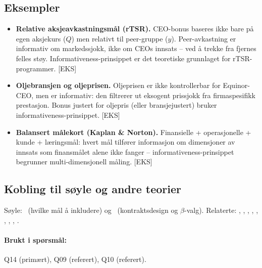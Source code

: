 \subsection*{Eksempler}
\begin{itemize}\setlength{\itemsep}{2pt}
\item \textbf{Relative aksjeavkastningsmål (rTSR).} CEO-bonus baseres ikke bare på egen aksjekurs ($Q$) men relativt til peer-gruppe ($y$). Peer-avkastning er informativ om markedssjokk, ikke om CEOs innsats -- ved å trekke fra fjernes felles støy. Informativeness-prinsippet er det teoretiske grunnlaget for rTSR-programmer. [EKS]
\item \textbf{Oljebransjen og oljeprisen.} Oljeprisen er ikke kontrollerbar for Equinor-CEO, men er informativ: den filtrerer ut eksogent prissjokk fra firmaspesifikk prestasjon. Bonus justert for oljepris (eller bransjejustert) bruker informativeness-prinsippet. [EKS]
\item \textbf{Balansert målekort (Kaplan \& Norton).} Finansielle + operasjonelle + kunde + læringsmål: hvert mål tilfører informasjon om dimensjoner av innsats som finansmålet alene ikke fanger -- informativeness-prinsippet begrunner multi-dimensjonell måling. [EKS]
\end{itemize}

\subsection*{Kobling til søyle og andre teorier}
Søyle: \STwo\ (hvilke mål å inkludere) og \SThree\ (kontraktsdesign og $\beta$-valg). Relaterte: , , , , , , , , .

\paragraph{Brukt i spørsmål:} Q14 (primært), Q09 (referert), Q10 (referert).

